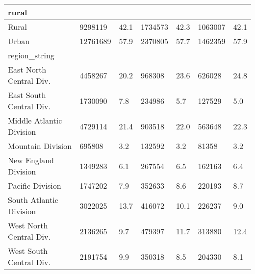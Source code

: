 \begin{longtable}{lllllll}
\midrule
\multicolumn{1}{l}{rural} \\ 
\midrule
Rural & 9298119 & 42.1 & 1734573 & 42.3 & 1063007 & 42.1 \\ 
Urban & 12761689 & 57.9 & 2370805 & 57.7 & 1462359 & 57.9 \\ 
\midrule
\multicolumn{1}{l}{region\_string} \\ 
\midrule
East North Central Div. & 4458267 & 20.2 & 968308 & 23.6 & 626028 & 24.8 \\ 
East South Central Div. & 1730090 & 7.8 & 234986 & 5.7 & 127529 & 5.0 \\ 
Middle Atlantic Division & 4729114 & 21.4 & 903518 & 22.0 & 563648 & 22.3 \\ 
Mountain Division & 695808 & 3.2 & 132592 & 3.2 & 81358 & 3.2 \\ 
New England Division & 1349283 & 6.1 & 267554 & 6.5 & 162163 & 6.4 \\ 
Pacific Division & 1747202 & 7.9 & 352633 & 8.6 & 220193 & 8.7 \\ 
South Atlantic Division & 3022025 & 13.7 & 416072 & 10.1 & 226237 & 9.0 \\ 
West North Central Div. & 2136265 & 9.7 & 479397 & 11.7 & 313880 & 12.4 \\ 
West South Central Div. & 2191754 & 9.9 & 350318 & 8.5 & 204330 & 8.1 \\ 
\bottomrule
\end{longtable}

